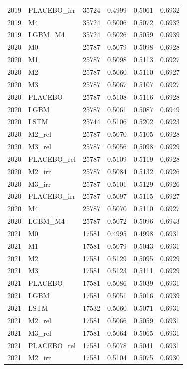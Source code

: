 \begin{tabular}{llrrrr}
2019 & PLACEBO\_irr & 35724 & 0.4999 & 0.5061 & 0.6932 \\
2019 & M4 & 35724 & 0.5006 & 0.5072 & 0.6932 \\
2019 & LGBM\_M4 & 35724 & 0.5026 & 0.5059 & 0.6939 \\
2020 & M0 & 25787 & 0.5079 & 0.5098 & 0.6928 \\
2020 & M1 & 25787 & 0.5098 & 0.5113 & 0.6927 \\
2020 & M2 & 25787 & 0.5060 & 0.5110 & 0.6927 \\
2020 & M3 & 25787 & 0.5067 & 0.5107 & 0.6927 \\
2020 & PLACEBO & 25787 & 0.5108 & 0.5116 & 0.6928 \\
2020 & LGBM & 25787 & 0.5061 & 0.5087 & 0.6949 \\
2020 & LSTM & 25744 & 0.5106 & 0.5202 & 0.6923 \\
2020 & M2\_rel & 25787 & 0.5070 & 0.5105 & 0.6928 \\
2020 & M3\_rel & 25787 & 0.5056 & 0.5098 & 0.6929 \\
2020 & PLACEBO\_rel & 25787 & 0.5109 & 0.5119 & 0.6928 \\
2020 & M2\_irr & 25787 & 0.5084 & 0.5132 & 0.6926 \\
2020 & M3\_irr & 25787 & 0.5101 & 0.5129 & 0.6926 \\
2020 & PLACEBO\_irr & 25787 & 0.5097 & 0.5115 & 0.6927 \\
2020 & M4 & 25787 & 0.5070 & 0.5110 & 0.6927 \\
2020 & LGBM\_M4 & 25787 & 0.5072 & 0.5096 & 0.6943 \\
2021 & M0 & 17581 & 0.4995 & 0.4998 & 0.6931 \\
2021 & M1 & 17581 & 0.5079 & 0.5043 & 0.6931 \\
2021 & M2 & 17581 & 0.5129 & 0.5095 & 0.6929 \\
2021 & M3 & 17581 & 0.5123 & 0.5111 & 0.6929 \\
2021 & PLACEBO & 17581 & 0.5086 & 0.5039 & 0.6931 \\
2021 & LGBM & 17581 & 0.5051 & 0.5016 & 0.6939 \\
2021 & LSTM & 17532 & 0.5060 & 0.5071 & 0.6931 \\
2021 & M2\_rel & 17581 & 0.5066 & 0.5059 & 0.6931 \\
2021 & M3\_rel & 17581 & 0.5064 & 0.5065 & 0.6931 \\
2021 & PLACEBO\_rel & 17581 & 0.5078 & 0.5041 & 0.6931 \\
2021 & M2\_irr & 17581 & 0.5104 & 0.5075 & 0.6930 \\

\end{tabular}
